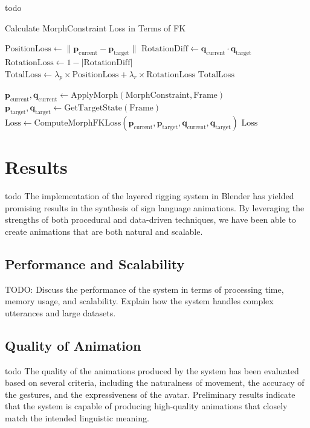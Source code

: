 \documentclass[../../main.tex]{subfiles}
\begin{document}
todo
\begin{algorithm}
    \caption{Calculate MorphConstraint Loss in Terms of FK}
    \begin{algorithmic}[1]
        \label{alg:morph_constraint_loss}
        \State $\text{PositionLoss} \gets \|\mathbf{p}_{\text{current}} - \mathbf{p}_{\text{target}}\|$
        \State $\text{RotationDiff} \gets \mathbf{q}_{\text{current}} \cdot \mathbf{q}_{\text{target}}$
        \State $\text{RotationLoss} \gets 1 - |\text{RotationDiff}|$
        \State $\text{TotalLoss} \gets \lambda_p \times \text{PositionLoss} + \lambda_r \times \text{RotationLoss}$
        \State \Return $\text{TotalLoss}$
    \EndProcedure
    
        \State $\mathbf{p}_{\text{current}}, \mathbf{q}_{\text{current}} \gets \text{ApplyMorph}(\text{MorphConstraint}, \text{Frame})$
        \State $\mathbf{p}_{\text{target}}, \mathbf{q}_{\text{target}} \gets \text{GetTargetState}(\text{Frame})$
        \State $\text{Loss} \gets \text{ComputeMorphFKLoss}(\mathbf{p}_{\text{current}}, \mathbf{p}_{\text{target}}, \mathbf{q}_{\text{current}}, \mathbf{q}_{\text{target}})$
        \State \Return $\text{Loss}$
    \EndProcedure
    
    \end{algorithmic}
\end{algorithm}

\section{Results}
\label{sec:results}
todo The implementation of the layered rigging system in Blender has yielded promising results in the synthesis of sign language animations. By leveraging the strengths of both procedural and data-driven techniques, we have been able to create animations that are both natural and scalable.

\subsection{Performance and Scalability}
TODO: Discuss the performance of the system in terms of processing time, memory usage, and scalability. Explain how the system handles complex utterances and large datasets.

\subsection{Quality of Animation}
todo The quality of the animations produced by the system has been evaluated based on several criteria, including the naturalness of movement, the accuracy of the gestures, and the expressiveness of the avatar. Preliminary results indicate that the system is capable of producing high-quality animations that closely match the intended linguistic meaning.
\end{document}
